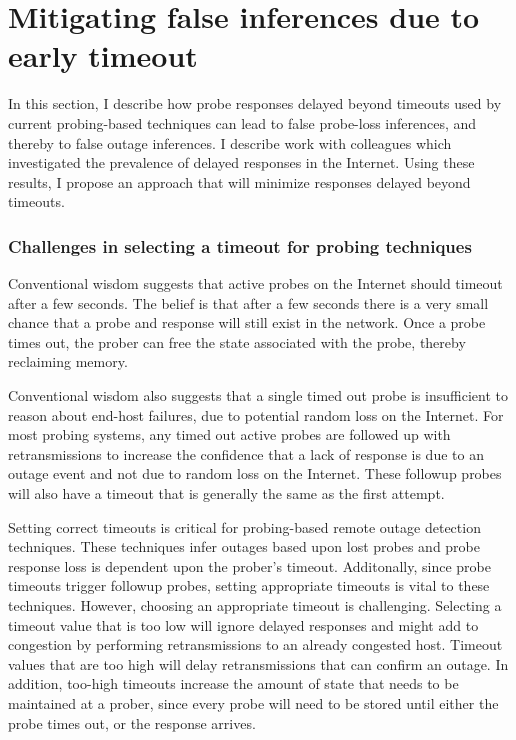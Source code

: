 
\chapter{Mitigating false inferences due to early timeout}
\label{cpt:timeouts}

In this section, I describe how probe responses delayed beyond
timeouts used by current probing-based techniques can lead to false
probe-loss inferences, and thereby to false outage inferences. I 
describe work with colleagues which
investigated the prevalence of delayed responses in the
Internet. Using these results, I propose an approach that will minimize responses
delayed beyond timeouts.

\subsection{Challenges in selecting a timeout for probing techniques}

Conventional wisdom suggests that active probes on the Internet should timeout
after a few seconds. The belief is that after a few seconds there is a very
small chance that a probe and response will still exist in the
network. Once a probe times out, the prober can free the state
associated with the probe, thereby reclaiming memory.

Conventional wisdom also suggests that a single timed out probe is
insufficient to reason about end-host failures, due to potential random loss on
the Internet. %
For most probing systems, any timed out active probes are followed up with
retransmissions to increase the confidence that a lack of response is due to
an outage event and not due to random loss on the Internet. These followup probes will also have a timeout that
is generally the same as the first attempt. 

Setting correct timeouts is critical for
probing-based remote outage detection techniques. These techniques infer outages
based upon lost probes and probe response loss is
dependent upon the prober's timeout. Additonally, since probe timeouts trigger followup probes, setting appropriate
timeouts is vital to these techniques. However, choosing an appropriate timeout is
challenging. Selecting a timeout value that is too low will ignore delayed
responses and might add to congestion by performing retransmissions to an
already congested host. Timeout values that are too high will delay
retransmissions that can confirm an outage. In addition, too-high timeouts
increase the amount of state that needs to be maintained at a prober, since
every probe will need to be stored until either the probe times out,
or the response arrives.

